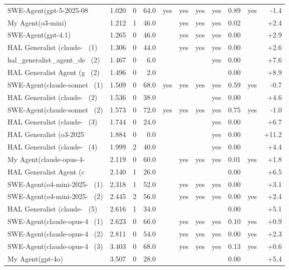 {\begin{longtable}{lrrrcccccrr}
SWE-Agent(gpt-5-2025-08~ & 1.020 & 0 & 64.0 & yes & yes & yes & yes & 0.89 & yes & -1.4 \\
My Agent(o3-mini) & 1.212 & 1 & 46.0 &  & yes & yes & yes & 0.02 &  & +2.4 \\
SWE-Agent(gpt-4.1) & 1.265 & 0 & 46.0 &  & yes & yes & yes & 0.00 &  & +2.9 \\
HAL Generalist (claude-~ (1) & 1.306 & 0 & 44.0 &  & yes & yes & yes & 0.00 &  & +2.6 \\
hal\_generalist\_agent\_de~ (2) & 1.467 & 0 & 6.0 &  &  &  & yes & 0.00 &  & +7.6 \\
HAL Generalist Agent (g~ (2) & 1.496 & 0 & 2.0 &  &  &  &  & 0.00 &  & +8.9 \\
SWE-Agent(claude-sonnet~ (1) & 1.509 & 0 & 68.0 & yes & yes & yes & yes & 0.59 & yes & -0.7 \\
HAL Generalist (claude-~ (2) & 1.536 & 0 & 38.0 &  &  &  & yes & 0.00 &  & +4.6 \\
SWE-Agent(claude-sonnet~ (2) & 1.573 & 0 & 72.0 & yes & yes & yes & yes & 0.75 & yes & -1.0 \\
HAL Generalist (claude-~ (3) & 1.744 & 0 & 24.0 &  &  &  & yes & 0.00 &  & +6.7 \\
HAL Generalist (o3-2025~ & 1.884 & 0 & 0.0 &  &  &  & yes & 0.00 &  & +11.2 \\
HAL Generalist (claude-~ (4) & 1.999 & 2 & 40.0 &  &  &  & yes & 0.00 &  & +4.4 \\
My Agent(claude-opus-4-~ & 2.119 & 0 & 60.0 &  & yes & yes & yes & 0.01 & yes & +1.8 \\
HAL Generalist Agent (c~ & 2.140 & 1 & 26.0 &  &  &  &  & 0.00 &  & +6.5 \\
SWE-Agent(o4-mini-2025-~ (1) & 2.318 & 1 & 52.0 &  & yes & yes & yes & 0.00 &  & +3.1 \\
SWE-Agent(o4-mini-2025-~ (2) & 2.445 & 2 & 56.0 &  & yes & yes & yes & 0.00 & yes & +2.4 \\
HAL Generalist (claude-~ (5) & 2.616 & 1 & 34.0 &  &  &  &  & 0.00 &  & +5.1 \\
SWE-Agent(claude-opus-4~ (1) & 2.623 & 0 & 66.0 &  & yes & yes & yes & 0.10 & yes & +0.9 \\
SWE-Agent(claude-opus-4~ (2) & 2.811 & 0 & 54.0 &  & yes & yes & yes & 0.00 & yes & +2.3 \\
SWE-Agent(claude-opus-4~ (3) & 3.403 & 0 & 68.0 &  & yes & yes & yes & 0.13 & yes & +0.6 \\
My Agent(gpt-4o) & 3.507 & 0 & 28.0 &  &  &  &  & 0.00 &  & +5.4 \\

\end{longtable}}
